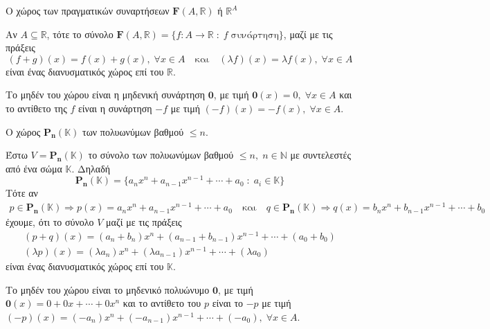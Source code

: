 \begin{example}\label{ex:funs} 
    \textcolor{Col2}{Ο χώρος των πραγματικών συναρτήσεων 
    $\mathbf{F}(A, \mathbb{R})$ ή $\mathbb{R} ^{A}$}

    Αν $ A \subseteq \mathbb{R} $, τότε το σύνολο 
    $ \mathbf{F}{(A, \mathbb{R})} = 
    \{ f \colon A \to \mathbb{R} \; : \; f \; \text{συνάρτηση} \} $, μαζί με 
    τις πράξεις
    \[
        (f+g)(x) = f(x) +g(x), \; \forall x \in A \quad \text{και} 
        \quad (\lambda f)(x)= \lambda f(x), \; \forall x \in A
    \] 
    είναι ένας διανυσματικός χώρος επί του $ \mathbb{R} $.

    Το μηδέν του χώρου είναι η μηδενική συνάρτηση $ \mathbf{0} $, με τιμή 
    $ \mathbf{0}(x)=0, \; \forall x \in A $ και το αντίθετο της $f$ είναι 
    η συνάρτηση $ -f $ με τιμή $ (-f)(x) = - f(x), \; \forall x \in A $.
\end{example}

\begin{example}
    \textcolor{Col2}{Ο χώρος $\mathbf{P_{n}(\mathbb{K})}$ των 
    πολυωνύμων βαθμού $ \leq n $}.

    Έστω $ V = \mathbf{P_{n}}(\mathbb{K}) $ το σύνολο των πολυωνύμων βαθμού 
    $ \leq n, \; n \in \mathbb{N}  $ με συντελεστές από ένα σώμα 
    $ \mathbb{K} $. Δηλαδή 
    \[
        \mathbf{P_{n}}(\mathbb{K}) = \{ a_{n}x^{n}+a_{n-1}x^{n-1}+\cdots +
        a_{0} \; : \; a_{i} \in \mathbb{K} \}  
    \]
    Τότε αν 
    \begin{gather*}
        p \in \mathbf{P_{n}}(\mathbb{K}) \Rightarrow p(x)
        = a_{n}x^{n}+a_{n-1}x^{n-1}+\cdots + a_{0} \quad \text{και} 
        \quad q \in \mathbf{P_{n}}(\mathbb{K}) \Rightarrow 
        q(x) = b_{n}x^{n}+b_{n-1}x^{n-1}+\cdots + b_{0} 
    \end{gather*} 
    έχουμε, ότι το σύνολο $ V $ μαζί με τις πράξεις 
    \begin{gather*}
        (p+q)(x) = (a_{n}+ b_{n})x^{n} + 
        (a_{n-1}+b_{n-1})x^{n-1}+ \cdots + (a_{0}+ b_{0}) \\
        (\lambda p)(x) = (\lambda a_{n})x^{n}+
        ( \lambda a_{n-1})x^{n-1}+ \cdots + ( \lambda a_{0})
    \end{gather*} 
    είναι ένας διανυσματικός χώρος επί του $ \mathbb{K} $.

    Το μηδέν του χώρου είναι το μηδενικό πολυώνυμο $ \mathbf{0} $, 
    με τιμή $ \mathbf{0}(x)=0+0x+\cdots +0x^{n} $ και το αντίθετο του 
    $p$ είναι το $ - p $ με τιμή $ (- p)(x) = 
    (-a_{n})x^{n}+(-a_{n-1})x^{n-1}+\cdots + (-a_{0}), \; \forall x \in A $.  
\end{example}

